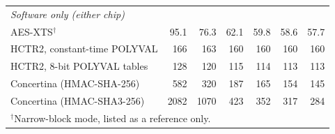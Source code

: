 \begin{table}[!hbt]
\begin{tabular}{lrrrrrr}
\hline
\multicolumn{7}{l}{\emph{Software only (either chip)}} \\
AES-XTS$^\dagger$                                    & 95.1 & 76.3 & 62.1 & 59.8 & 58.6 & 57.7 \\
HCTR2, constant-time POLYVAL                         & 166 & 163 & 160 & 160 & 160 & 160 \\
HCTR2, 8-bit POLYVAL tables                          & 128 & 120 & 115 & 114 & 113 & 113 \\
Concertina (HMAC-SHA-256)                            & 582 & 320 & 187 & 165 & 154 & 145 \\
Concertina (HMAC-SHA3-256)                           & 2082 & 1070 & 423 & 352 & 317 & 284 \\
\hline
\multicolumn{7}{l}{\footnotesize $^\dagger$Narrow-block mode, listed as a reference only.}
\end{tabular}
\end{table}
